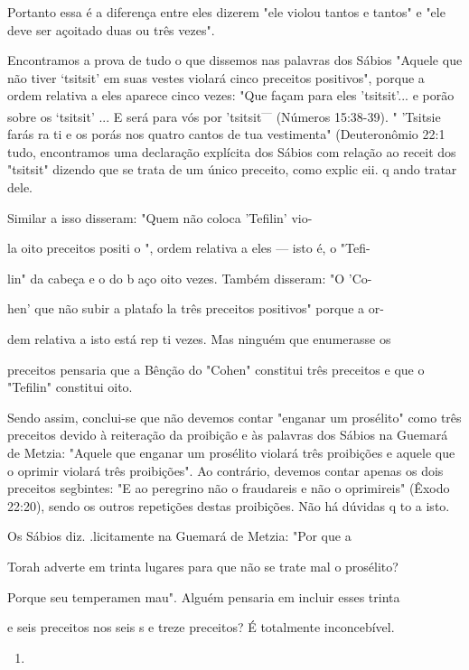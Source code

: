 \begin{itemize}
\begin{enumrate}
Portanto essa é a diferença entre eles dizerem "ele violou tantos e
tantos" e "ele deve ser açoitado duas ou três vezes".

Encontramos a prova de tudo o que dissemos nas palavras dos Sá­bios
"Aquele que não tiver `tsitsit' em suas vestes violará cinco preceitos
posi­tivos", porque a ordem relativa a eles aparece cinco vezes: "Que
façam para eles 'tsitsit'... e porão sobre os `tsitsit' ... E será para
vós por 'tsitsit\textsuperscript{---} (Números 15:38-39). " 'Tsitsie
farás ra ti e os porás nos quatro cantos de tua vestimen­ta"
(Deuteronômio 22:1 tudo, encontramos uma declaração explícita dos Sábios
com relação ao receit dos "tsitsit" dizendo que se trata de um único
preceito, como explic eii. q ando tratar dele.

Similar a isso disseram: "Quem não coloca 'Tefilin' vio-

la oito preceitos positi o ", ordem relativa a eles --- isto é, o "Tefi-

lin" da cabeça e o do b aço oito vezes. Também disseram: "O 'Co-

hen' que não subir a platafo la três preceitos positivos" porque a or-

dem relativa a isto está rep ti vezes. Mas ninguém que enumerasse os

preceitos pensaria que a Bênção do "Cohen" constitui três preceitos e
que o "Tefilin" constitui oito.

Sendo assim, conclui-se que não devemos contar "enganar um pro­sélito"
como três preceitos devido à reiteração da proibição e às palavras dos
Sábios na Guemará de Metzia: "Aquele que enganar um prosélito violará
três proibições e aquele que o oprimir violará três proibições". Ao
contrário, deve­mos contar apenas os dois preceitos segbintes: "E ao
peregrino não o frauda­reis e não o oprimireis" (Êxodo 22:20), sendo os
outros repetições destas proi­bições. Não há dúvidas q to a isto.

Os Sábios diz. .licitamente na Guemará de Metzia: "Por
que a

Torah adverte em trinta lugares para que não se trate mal o prosélito?

Porque seu temperamen mau". Alguém pensaria em incluir esses trinta

e seis preceitos nos seis s e treze preceitos? É totalmente
inconcebível.


\begin{enumerate}
\def\labelenumi{\arabic{enumi}.}
\setcounter{enumi}{12}
\item
 

\end{enumerate}
\end{enumrate}
\end{itemize}
